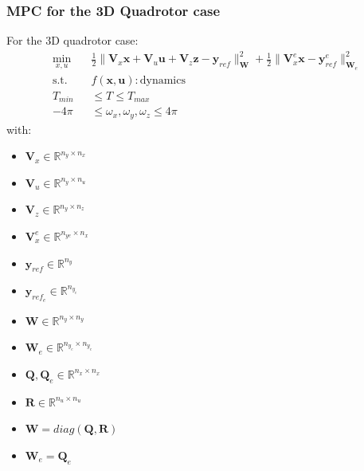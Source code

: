 \documentclass{thesisbeamer}
\begin{document}
\begin{frame}
	\frametitle{MPC for the 3D Quadrotor case}
	
	For the 3D quadrotor case:
	\begin{equation}\label{mpc_optimization_problem_3d_quadrotor}
\begin{aligned}
            \min_{x,u} \quad & \frac{1}{2}\|\bm{V}_x \bm{x} + \bm{V}_u \bm{u} + \bm{V}_z \bm{z} - \bm{y}_{ref}\|^2_{\bm{W}} + \frac{1}{2}\|\bm{V}_x^e \bm{x} - \bm{y}_{ref}^e \|^2_{\bm{W}_e} \\
            \textrm{s.t.} \quad & f(\bm{x},\bm{u}):\text{dynamics} \\
             T_{min} &\leq T \leq T_{max} \\
             -4 \pi &\leq \omega_x, \omega_y, \omega_z \leq 4 \pi
        \end{aligned}
\end{equation}
with: 
\begin{multicols}{3}
\begin{itemize}
	\item $\bm{V}_x \in \mathbb{R}^{n_y \times n_x}$
	\item $\bm{V}_u \in \mathbb{R}^{n_y \times n_u}$ 
	\item $\bm{V}_z \in \mathbb{R}^{n_y \times n_z}$
	\item $\bm{V}_x^e \in \mathbb{R}^{n_{ye}\times n_x}$
\end{itemize}
\columnbreak
\begin{itemize}
	\item $\bm{y}_{ref} \in \mathbb{R}^{n_y}$
	\item $\bm{y}_{ref_e} \in \mathbb{R}^{n_{y_e}}$
	\item $\bm{W} \in \mathbb{R}^{n_y \times n_y}$
	\item $\bm{W}_e \in \mathbb{R}^{n_{y_e} \times n_{y_e}}$
\end{itemize}
\columnbreak
\begin{itemize}
	\item $\bm{Q},\bm{Q}_e \in \mathbb{R}^{n_x \times n_x}$
	\item $\bm{R} \in \mathbb{R}^{n_u \times n_u}$
	\item $\bm{W} = diag(\bm{Q},\bm{R}) $
	\item $\bm{W}_e = \bm{Q}_e $
\end{itemize}
\end{multicols}
	
\end{frame}
\end{document}
